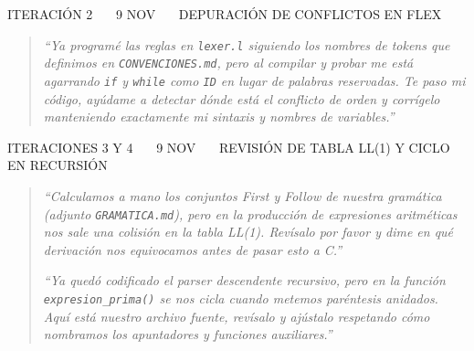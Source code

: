\documentclass[12pt]{article}
\newcommand{\cmd}[1]{\texttt{\small #1}}
\begin{document}
\begin{apartado}{ITERACIÓN 2 \ \textbullet\ \ 9 NOV \ \textbullet\ \ DEPURACIÓN DE CONFLICTOS EN FLEX}
\begin{quote}
\emph{``Ya programé las reglas en \cmd{lexer.l} siguiendo los nombres de tokens que definimos en
\cmd{CONVENCIONES.md}, pero al compilar y probar me está agarrando \cmd{if} y \cmd{while} como
\cmd{ID} en lugar de palabras reservadas. Te paso mi código, ayúdame a detectar dónde está el
conflicto de orden y corrígelo manteniendo exactamente mi sintaxis y nombres de variables.''}
\end{quote}
\end{apartado}

\begin{apartado}{ITERACIONES 3 Y 4 \ \textbullet\ \ 9 NOV \ \textbullet\ \ REVISIÓN DE TABLA LL(1) Y CICLO EN RECURSIÓN}
\begin{quote}
\emph{``Calculamos a mano los conjuntos First y Follow de nuestra gramática (adjunto
\cmd{GRAMATICA.md}), pero en la producción de expresiones aritméticas nos sale una colisión en
la tabla LL(1). Revísalo por favor y dime en qué derivación nos equivocamos antes de pasar esto
a C.''}

\emph{``Ya quedó codificado el parser descendente recursivo, pero en la función
\cmd{expresion\_prima()} se nos cicla cuando metemos paréntesis anidados. Aquí está nuestro archivo
fuente, revísalo y ajústalo respetando cómo nombramos los apuntadores y funciones auxiliares.''}
\end{quote}
\end{apartado}
\end{document}
